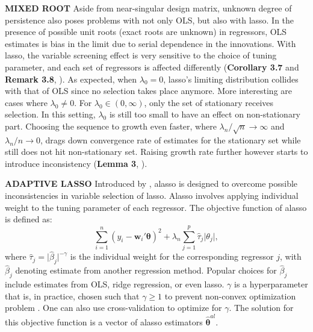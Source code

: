 \documentclass[12pt,a4paper]{article}
\DeclareMathOperator*{\argmin}{arg\,min} %
\begin{document}
\textbf{MIXED ROOT} Aside from near-singular design matrix, unknown degree of persistence also poses problems with not only OLS, but also with lasso. In the presence of possible unit roots (exact roots are unknown) in regressors, OLS estimates is bias in the limit due to serial dependence in the innovations. With lasso, the variable screening effect is very sensitive to the choice of tuning parameter, and each set of regressors is affected differently (\textbf{Corollary 3.7} and \textbf{Remark 3.8}, \cite{lee2018lasso}). As expected, when $ \lambda_0 = 0 $, lasso's limiting distribution collides with that of OLS since no selection takes place anymore. More interesting are cases where $ \lambda_0 \neq 0 $. For $ \lambda_0 \in (0, \infty) $, only the set of stationary receives selection. In this setting, $ \lambda_0 $ is still too small to have an effect on non-stationary part. Choosing the sequence to growth even faster, where  $ \lambda_n/\sqrt{n} \rightarrow \infty $ and $ \lambda_n/n \rightarrow 0 $, drags down convergence rate of estimates for the stationary set while still does not hit non-stationary set. Raising growth rate further however starts to introduce inconsistency (\textbf{Lemma 3}, \cite{zou2006adaptive}).

\textbf{ADAPTIVE LASSO} Introduced by \cite{zou2006adaptive}, alasso is designed to overcome possible inconsistencies in variable selection of lasso. Alasso involves applying individual weight to the tuning parameter of each regressor. The objective function of alasso is defined as:
\begin{equation}\label{eq:7}
	\sum_{i = 1}^n(y_i - \bm{w}_i'\bm{\theta})^2 + 
	\lambda_n\sum_{j = 1}^p \hat{\tau}_j \vert\theta_j\vert,
\end{equation}
where $ \hat{\tau}_j = \vert\hat{\beta}_j\vert^{-\gamma} $ is the individual weight for the corresponding regressor $ j $, with $ \hat{\beta}_j $ denoting estimate from another regression method. Popular choices for $ \hat{\beta}_j $ include estimates from OLS, ridge regression, or even lasso. $ \gamma $ is a hyperparameter that is, in practice, chosen such that $ \gamma \geq 1 $ to prevent non-convex optimization problem \citep{lee2018lasso}. One can also use cross-validation to optimize for $ \gamma $. The solution for this objective function is a vector of alasso estimators $ \hat{\bm{\theta}}^{al} $.
\end{document}
